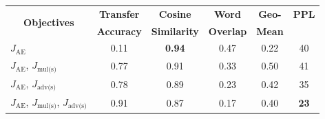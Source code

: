 \documentclass[letterpaper]{article} %
\newcommand{\tabh}[1]{\multicolumn{1}{c|}{\textbf{#1}}}
\newcommand{\tabc}[2]{\multicolumn{1}{|c||}{\multirow{#1}{*}{\textbf{#2}}}}
\newcommand{\loss}[1]{J_{\text{#1}}}
\begin{document}
\begin{table}[ht]
	\centering\vspace{-.2cm}
	\begin{tabular}{| l || c | c | c | c | c |}
		\hline
		\tabc{2}{Objectives}                                                            & \tabh{Transfer} & \tabh{Cosine}     & \tabh{Word}    & \tabh{Geo-}    & \tabh{PPL}  \\
		                                                                                & \tabh{Accuracy} & \tabh{Similarity} & \tabh{Overlap} & \tabh{Mean}   & \tabh{}     \\
		\hline\hline
		$\loss{AE}$                                                                     & 0.11            & \textbf{0.94}     & 0.47           & 0.22          & 40          \\ \hline
		$\loss{AE}$, $\loss{mul(s)}$                                                    & 0.77            & 0.91              & 0.33           & 0.50          & 41          \\ \hline
		$\loss{AE}$, $\loss{adv(s)}$                                                    & 0.78            & 0.89              & 0.23           & 0.42          & 35          \\ \hline
		$\loss{AE}$, $\loss{mul(s)}$, $\loss{adv(s)}$                                   & 0.91            & 0.87              & 0.17           & 0.40          & \textbf{23} \\ \hline

\end{tabular}
\end{table}
\end{document}
